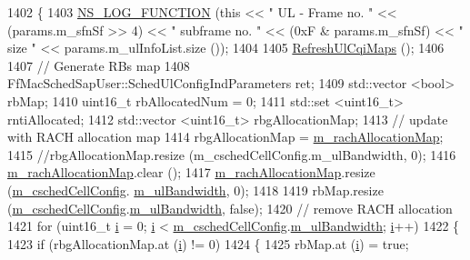\begin{DoxyCode}
1402 \{
1403   \hyperlink{log-macros-disabled_8h_a90b90d5bad1f39cb1b64923ea94c0761}{NS\_LOG\_FUNCTION} (\textcolor{keyword}{this} << \textcolor{stringliteral}{" UL - Frame no. "} << (params.m\_sfnSf >> 4) << \textcolor{stringliteral}{" subframe no. "} 
      << (0xF & params.m\_sfnSf) << \textcolor{stringliteral}{" size "} << params.m\_ulInfoList.size ());
1404 
1405   \hyperlink{classns3_1_1FdMtFfMacScheduler_a42d3210d4a4f25cae1eaf3511e8d34e1}{RefreshUlCqiMaps} ();
1406 
1407   \textcolor{comment}{// Generate RBs map}
1408   FfMacSchedSapUser::SchedUlConfigIndParameters ret;
1409   std::vector <bool> rbMap;
1410   uint16\_t rbAllocatedNum = 0;
1411   std::set <uint16\_t> rntiAllocated;
1412   std::vector <uint16\_t> rbgAllocationMap;
1413   \textcolor{comment}{// update with RACH allocation map}
1414   rbgAllocationMap = \hyperlink{classns3_1_1FdMtFfMacScheduler_aab050196c56e8564eb4d0c8aedd900d3}{m\_rachAllocationMap};
1415   \textcolor{comment}{//rbgAllocationMap.resize (m\_cschedCellConfig.m\_ulBandwidth, 0);}
1416   \hyperlink{classns3_1_1FdMtFfMacScheduler_aab050196c56e8564eb4d0c8aedd900d3}{m\_rachAllocationMap}.clear ();
1417   \hyperlink{classns3_1_1FdMtFfMacScheduler_aab050196c56e8564eb4d0c8aedd900d3}{m\_rachAllocationMap}.resize (\hyperlink{classns3_1_1FdMtFfMacScheduler_a9f2e3c6bfae8bfc266a84f64e5937ac8}{m\_cschedCellConfig}.
      \hyperlink{structns3_1_1FfMacCschedSapProvider_1_1CschedCellConfigReqParameters_a5ab5b102878e6e7e7727a14af4a64d2f}{m\_ulBandwidth}, 0);
1418 
1419   rbMap.resize (\hyperlink{classns3_1_1FdMtFfMacScheduler_a9f2e3c6bfae8bfc266a84f64e5937ac8}{m\_cschedCellConfig}.\hyperlink{structns3_1_1FfMacCschedSapProvider_1_1CschedCellConfigReqParameters_a5ab5b102878e6e7e7727a14af4a64d2f}{m\_ulBandwidth}, \textcolor{keyword}{false});
1420   \textcolor{comment}{// remove RACH allocation}
1421   \textcolor{keywordflow}{for} (uint16\_t \hyperlink{bernuolliDistribution_8m_a6f6ccfcf58b31cb6412107d9d5281426}{i} = 0; \hyperlink{bernuolliDistribution_8m_a6f6ccfcf58b31cb6412107d9d5281426}{i} < \hyperlink{classns3_1_1FdMtFfMacScheduler_a9f2e3c6bfae8bfc266a84f64e5937ac8}{m\_cschedCellConfig}.\hyperlink{structns3_1_1FfMacCschedSapProvider_1_1CschedCellConfigReqParameters_a5ab5b102878e6e7e7727a14af4a64d2f}{m\_ulBandwidth}; 
      \hyperlink{bernuolliDistribution_8m_a6f6ccfcf58b31cb6412107d9d5281426}{i}++)
1422     \{
1423       \textcolor{keywordflow}{if} (rbgAllocationMap.at (\hyperlink{bernuolliDistribution_8m_a6f6ccfcf58b31cb6412107d9d5281426}{i}) != 0)
1424         \{
1425           rbMap.at (\hyperlink{bernuolliDistribution_8m_a6f6ccfcf58b31cb6412107d9d5281426}{i}) = \textcolor{keyword}{true};

\end{DoxyCode}
